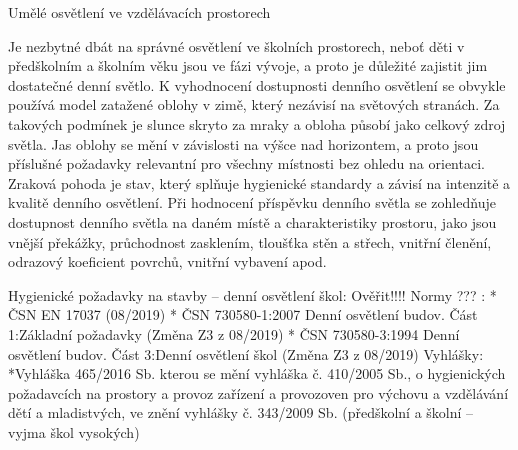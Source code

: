 

\sec Umělé osvětlení ve vzdělávacích prostorech

Je nezbytné dbát na správné osvětlení ve školních prostorech, neboť děti v předškolním a školním věku jsou ve fázi vývoje, a proto je důležité zajistit jim dostatečné denní světlo. K vyhodnocení dostupnosti denního osvětlení se obvykle používá model zatažené oblohy v zimě, který nezávisí na světových stranách. Za takových podmínek je slunce skryto za mraky a obloha působí jako celkový zdroj světla. Jas oblohy se mění v závislosti na výšce nad horizontem, a proto jsou příslušné požadavky relevantní pro všechny místnosti bez ohledu na orientaci. 
\medskip
Zraková pohoda je stav, který splňuje hygienické standardy a závisí na intenzitě a kvalitě denního osvětlení. Při hodnocení příspěvku denního světla se zohledňuje dostupnost denního světla na daném místě a charakteristiky prostoru, jako jsou vnější překážky, průchodnost zasklením, tloušťka stěn a střech, vnitřní členění, odrazový koeficient povrchů, vnitřní vybavení apod.

\secc Hygienické požadavky na stavby – denní osvětlení škol:
Ověřit!!!! Normy ??? :
\begitems
* ČSN EN 17037 (08/2019)
* ČSN 730580-1:2007 Denní osvětlení budov. Část 1:Základní požadavky (Změna Z3 z 08/2019)
* ČSN 730580-3:1994 Denní osvětlení budov. Část 3:Denní osvětlení škol (Změna Z3 z 08/2019)
\medskip
{\sbf Vyhlášky:}
\medskip
*Vyhláška 465/2016 Sb. kterou se mění vyhláška č. 410/2005 Sb., o hygienických požadavcích na prostory a provoz zařízení a provozoven pro výchovu a vzdělávání dětí a mladistvých, ve znění vyhlášky č. 343/2009 Sb.
(předškolní a školní – vyjma škol vysokých)

